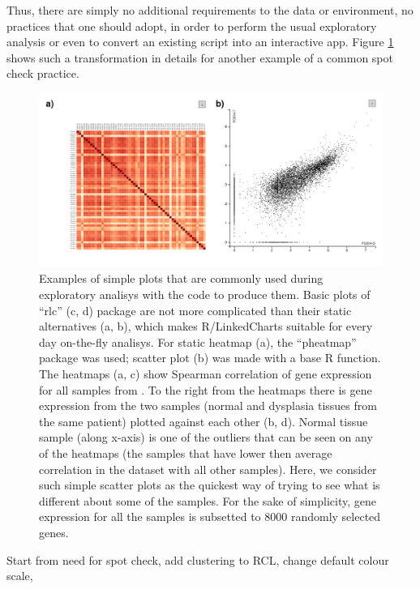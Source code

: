 \documentclass[twocolumn,10pt]{article}
\begin{document}
Thus, there are simply no additional requirements to the data or environment, no practices that one should adopt, in order to perform the usual exploratory analysis or even to convert an existing script into an interactive app. Figure \ref{FigE} shows such a transformation in details for another example of a common spot check practice.


\begin{figure}[h]
  \includegraphics[width=\textwidth]{FigE/figE.png}
  \caption{Examples of simple plots that are commonly used during exploratory analisys with the code to produce them. Basic plots of ``rlc'' (c, d) package are not more complicated than their static alternatives (a, b), which makes R/LinkedCharts suitable for every day on-the-fly analisys. For static heatmap (a), the ``pheatmap'' package was used; scatter plot (b) was made with a base R function. The heatmaps (a, c) show Spearman correlation of gene expression for all samples from \citet{conway_2015}. To the right from the heatmaps there is gene expression from the two samples (normal and dysplasia tissues from the same patient) plotted against each other (b, d). Normal tissue sample (along x-axis) is one of the outliers that can be seen on any of the heatmaps (the samples that have lower then average correlation in the dataset with all other samples). Here, we consider such simple scatter plots as the quickest way of trying to see what is different about some of the samples. For the sake of simplicity, gene expression for all the samples is subsetted to 8000 randomly selected genes.}
  \label{FigE}
\end{figure}

Start from need for spot check, add clustering to RCL, change default colour scale,
\end{document}
